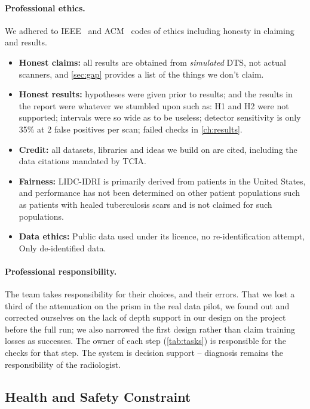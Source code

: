 \paragraph{Professional ethics.} We adhered to IEEE~\cite{ieeeethics} and ACM~\cite{acmethics} codes of ethics including honesty in claiming and results.
\begin{itemize}
  \item \textbf{Honest claims:} all results are obtained from \emph{simulated} DTS, not actual scanners, and \cref{sec:gap} provides a list of the things we don't claim.\item \textbf{Honest results:} hypotheses were given prior to results; and the results in the report were whatever we stumbled upon such as: H1 and H2 were not supported; intervals were so wide as to be useless; detector sensitivity is only 35\% at 2 false positives per scan; failed checks in \cref{ch:results}.\item \textbf{Credit:} all datasets, libraries and ideas we build on are cited, including the data citations mandated by TCIA.\item \textbf{Fairness:} LIDC-IDRI is primarily derived from patients in the United States, and performance has not been determined on other patient populations such as patients with healed tuberculosis scars and is not claimed for such populations.\item \textbf{Data ethics:} Public data used under its licence, no re-identification attempt, Only de-identified data.
\end{itemize}

\paragraph{Professional responsibility.} The team takes responsibility for their choices, and their errors. That we lost a third of the attenuation on the prism in the real data pilot, we found out and corrected ourselves on the lack of depth support in our design on the project before the full run; we also narrowed the first design rather than claim training losses as successes. The owner of each step (\cref{tab:tasks}) is responsible for the checks for that step. The system is decision support -- diagnosis remains the responsibility of the radiologist.

\subsection{Health and Safety Constraint}


